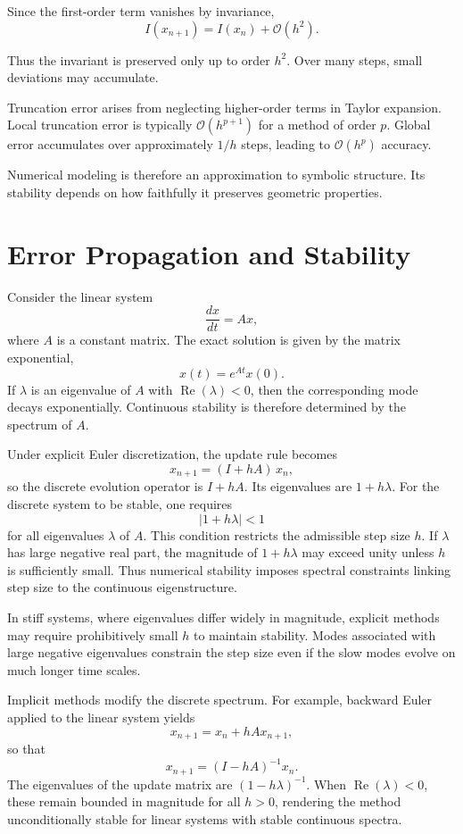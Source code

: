 \documentclass[12pt]{book}
\begin{document}
Since the first-order term vanishes by invariance,
\[
I(x_{n+1})
=
I(x_n)
+
\mathcal{O}(h^2).
\]

Thus the invariant is preserved only up to order $h^2$. Over many steps, small deviations may accumulate.

Truncation error arises from neglecting higher-order terms in Taylor expansion. Local truncation error is typically $\mathcal{O}(h^{p+1})$ for a method of order $p$. Global error accumulates over approximately $1/h$ steps, leading to $\mathcal{O}(h^p)$ accuracy.

Numerical modeling is therefore an approximation to symbolic structure. Its stability depends on how faithfully it preserves geometric properties.

\section{Error Propagation and Stability}

Consider the linear system
\[
\frac{dx}{dt} = A x,
\]
where $A$ is a constant matrix. The exact solution is given by the
matrix exponential,
\[
x(t) = e^{A t} x(0).
\]
If $\lambda$ is an eigenvalue of $A$ with $\operatorname{Re}(\lambda) < 0$,
then the corresponding mode decays exponentially. Continuous stability
is therefore determined by the spectrum of $A$.

Under explicit Euler discretization, the update rule becomes
\[
x_{n+1} = (I + h A)\, x_n,
\]
so the discrete evolution operator is $I + hA$. Its eigenvalues are
$1 + h\lambda$. For the discrete system to be stable, one requires
\[
|1 + h\lambda| < 1
\]
for all eigenvalues $\lambda$ of $A$. This condition restricts the
admissible step size $h$. If $\lambda$ has large negative real part,
the magnitude of $1 + h\lambda$ may exceed unity unless $h$ is
sufficiently small. Thus numerical stability imposes spectral
constraints linking step size to the continuous eigenstructure.

In stiff systems, where eigenvalues differ widely in magnitude,
explicit methods may require prohibitively small $h$ to maintain
stability. Modes associated with large negative eigenvalues constrain
the step size even if the slow modes evolve on much longer time
scales.

Implicit methods modify the discrete spectrum. For example, backward
Euler applied to the linear system yields
\[
x_{n+1} = x_n + h A x_{n+1},
\]
so that
\[
x_{n+1} = (I - hA)^{-1} x_n.
\]
The eigenvalues of the update matrix are $(1 - h\lambda)^{-1}$.
When $\operatorname{Re}(\lambda) < 0$, these remain bounded in magnitude
for all $h > 0$, rendering the method unconditionally stable for linear
systems with stable continuous spectra.
\end{document}
